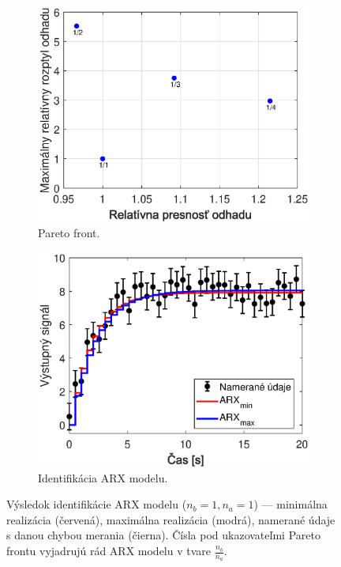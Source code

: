 \begin{figure}
	\centering
		\centering
	\begin{subfigure}[b]{0.48\textwidth}
		\centering
		\includegraphics[width=\linewidth]{images/gpe_tf_ex_ARXpareto}
		\caption{Pareto front.}
		\label{fig:gpe_tf_ex_ARXpareto}
	\end{subfigure}
	\begin{subfigure}[b]{0.48\textwidth}
		\centering
		\includegraphics[width=\linewidth]{images/gpe_tf_ex_ARXident}
		\caption{Identifikácia ARX modelu.}
		\label{fig:gpe_tf_ex_ARXident}
	\end{subfigure}
	\caption{Výsledok identifikácie ARX modelu ($ n_b = 1, n_a = 1 $) --- minimálna realizácia (červená), maximálna realizácia (modrá), namerané údaje s danou chybou merania (čierna). Čísla pod ukazovateľmi Pareto frontu vyjadrujú rád ARX modelu v tvare $ \frac{n_b}{n_a} $.}
	\label{fig:gpe_tf_ex_ARX}
\end{figure}

